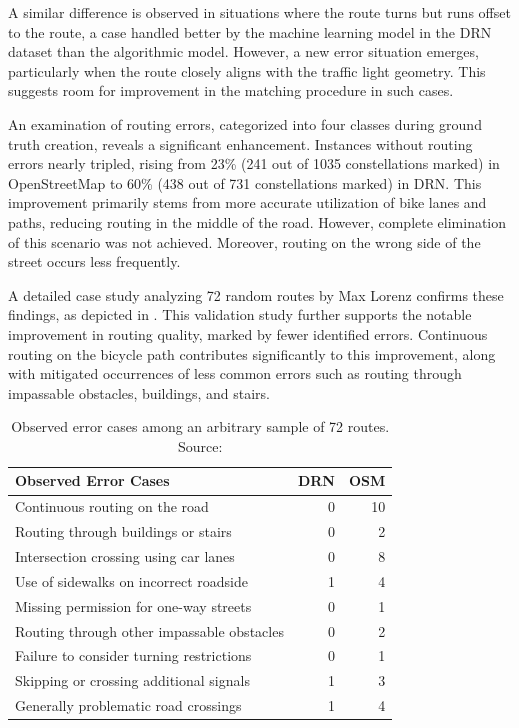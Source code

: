 A similar difference is observed in situations where the route turns but runs offset to the route, a case handled better by the machine learning model in the DRN dataset than the algorithmic model. However, a new error situation emerges, particularly when the route closely aligns with the traffic light geometry. This suggests room for improvement in the matching procedure in such cases.

An examination of routing errors, categorized into four classes during ground truth creation, reveals a significant enhancement. Instances without routing errors nearly tripled, rising from 23\% (241 out of 1035 constellations marked) in OpenStreetMap to 60\% (438 out of 731 constellations marked) in DRN. This improvement primarily stems from more accurate utilization of bike lanes and paths, reducing routing in the middle of the road. However, complete elimination of this scenario was not achieved. Moreover, routing on the wrong side of the street occurs less frequently.

A detailed case study analyzing 72 random routes by Max Lorenz \cite{lorenz_2022} confirms these findings, as depicted in . This validation study further supports the notable improvement in routing quality, marked by fewer identified errors. Continuous routing on the bicycle path contributes significantly to this improvement, along with mitigated occurrences of less common errors such as routing through impassable obstacles, buildings, and stairs.

\begin{table}[t]
\centering
\begin{tabular}{@{}lrr@{}}
\hline
\textbf{Observed Error Cases} & \textbf{DRN} & \textbf{OSM} \\ \hline
Continuous routing on the road & 0 & 10 \\
Routing through buildings or stairs & 0 & 2 \\
Intersection crossing using car lanes & 0 & 8 \\
Use of sidewalks on incorrect roadside & 1 & 4 \\
Missing permission for one-way streets & 0 & 1 \\
Routing through other impassable obstacles & 0 & 2 \\
Failure to consider turning restrictions & 0 & 1 \\
Skipping or crossing additional signals & 1 & 3 \\
Generally problematic road crossings & 1 & 4 \\
\hline
\end{tabular}
\caption{Observed error cases among an arbitrary sample of 72 routes. Source: \cite{lorenz_2022}}%
\label{tab:error-cases-max-lorenz}%
\end{table}

